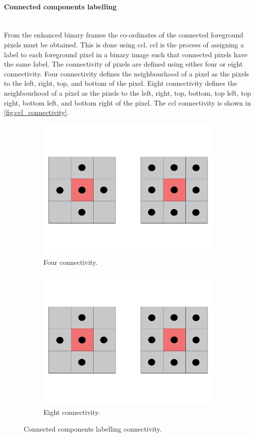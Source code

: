 \paragraph{Connected components labelling}\label{par:ccl}\mbox{}\\
From the enhanced binary frames the co-ordinates of the connected foreground pixels must be obtained. This is done using \gls{ccl}. \Gls{ccl} is the process of assigning a label to each foreground pixel in a binary image such that connected pixels have the same label. The connectivity of pixels are defined using either four or eight connectivity. Four connectivity defines the neighbourhood of a pixel as the pixels to the left, right, top, and bottom of the pixel. Eight connectivity defines the neighbourhood of a pixel as the pixels to the left, right, top, bottom, top left, top right, bottom left, and bottom right of the pixel. The \gls{ccl} connectivity is shown in \autoref{fig:ccl_connectivity}.
\begin{figure}[h]
  \centering
  \begin{subfigure}[b]{0.3\textwidth}
    \centering
    \includegraphics[width=0.6\linewidth]{figures/detection/4_pixel_connectivity.pdf}
    \caption{Four connectivity.}
    \label{fig:four_connectivity}
  \end{subfigure}
  \quad
  \begin{subfigure}[b]{0.3\textwidth}
    \centering
    \includegraphics[width=0.6\linewidth]{figures/detection/8_pixel_connectivity.pdf}
    \caption{Eight connectivity.}
    \label{fig:eight_connectivity}
  \end{subfigure}
  \caption{Connected components labelling connectivity.}
  \label{fig:ccl_connectivity}
\end{figure}

